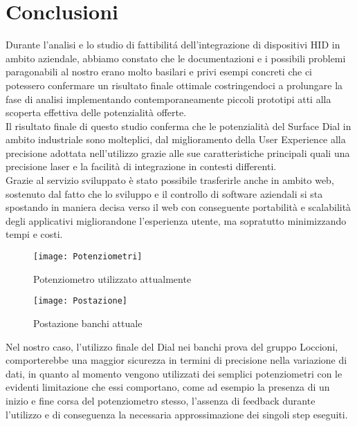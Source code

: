 \chapter{Conclusioni}
\label{chap: Conclusioni}

Durante l'analisi e lo studio di fattibilitá dell'integrazione di dispositivi HID in ambito aziendale, abbiamo constato che le documentazioni e i possibili problemi paragonabili al nostro erano molto basilari e privi esempi concreti che ci potessero confermare un risultato finale ottimale costringendoci a prolungare la fase di analisi implementando contemporaneamente piccoli prototipi atti alla scoperta effettiva delle potenzialità offerte.\\

Il risultato finale di questo studio conferma che le potenzialità del Surface Dial in ambito industriale sono molteplici, dal miglioramento della User Experience alla precisione adottata nell’utilizzo grazie alle sue caratteristiche principali quali una precisione laser e la facilità di integrazione in contesti differenti.\\

Grazie al servizio sviluppato è stato possibile trasferirle anche in ambito web, sostenuto dal fatto che lo sviluppo e il controllo di software aziendali si sta spostando in maniera decisa verso il web con conseguente portabilità e scalabilità degli applicativi migliorandone l'esperienza utente, ma sopratutto minimizzando tempi e costi.\\

\begin{figure}[htpb!]
	\begin{minipage}{0.35\textwidth}
		\centering
		\texttt{[image: Potenziometri]}
		\caption{Potenziometro utilizzato attualmente}
    \end{minipage}\hfill
    \begin{minipage}{0.65\textwidth}
		\centering
		\texttt{[image: Postazione]}
		\caption{Postazione banchi attuale}
    \end{minipage}
\end{figure}

Nel nostro caso, l’utilizzo finale del Dial nei banchi prova del gruppo Loccioni, comporterebbe una maggior sicurezza in termini di precisione nella variazione di dati, in quanto al momento vengono utilizzati dei semplici potenziometri con le evidenti limitazione che essi comportano, come ad esempio la presenza di un inizio e fine corsa del potenziometro stesso, l’assenza di feedback durante l’utilizzo e di conseguenza la necessaria approssimazione dei singoli step eseguiti.

